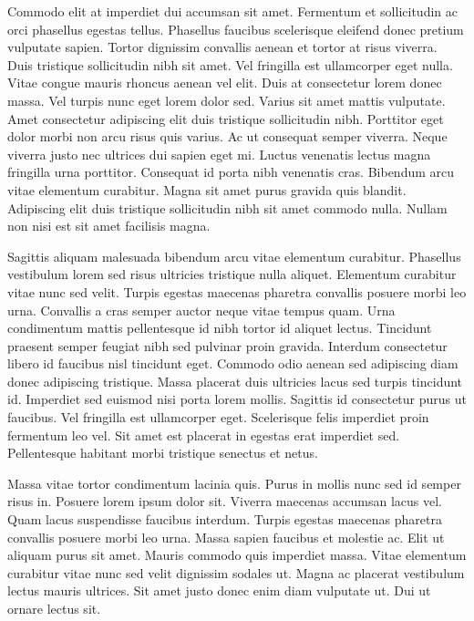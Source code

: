 \documentclass[11pt,a4paper]{article}
\begin{document}
Commodo elit at imperdiet dui accumsan sit amet. Fermentum et sollicitudin ac orci phasellus egestas tellus. Phasellus faucibus scelerisque eleifend donec pretium vulputate sapien. Tortor dignissim convallis aenean et tortor at risus viverra. Duis tristique sollicitudin nibh sit amet. Vel fringilla est ullamcorper eget nulla. Vitae congue mauris rhoncus aenean vel elit. Duis at consectetur lorem donec massa. Vel turpis nunc eget lorem dolor sed. Varius sit amet mattis vulputate. Amet consectetur adipiscing elit duis tristique sollicitudin nibh. Porttitor eget dolor morbi non arcu risus quis varius. Ac ut consequat semper viverra. Neque viverra justo nec ultrices dui sapien eget mi. Luctus venenatis lectus magna fringilla urna porttitor. Consequat id porta nibh venenatis cras. Bibendum arcu vitae elementum curabitur. Magna sit amet purus gravida quis blandit. Adipiscing elit duis tristique sollicitudin nibh sit amet commodo nulla. Nullam non nisi est sit amet facilisis magna.

Sagittis aliquam malesuada bibendum arcu vitae elementum curabitur. Phasellus vestibulum lorem sed risus ultricies tristique nulla aliquet. Elementum curabitur vitae nunc sed velit. Turpis egestas maecenas pharetra convallis posuere morbi leo urna. Convallis a cras semper auctor neque vitae tempus quam. Urna condimentum mattis pellentesque id nibh tortor id aliquet lectus. Tincidunt praesent semper feugiat nibh sed pulvinar proin gravida. Interdum consectetur libero id faucibus nisl tincidunt eget. Commodo odio aenean sed adipiscing diam donec adipiscing tristique. Massa placerat duis ultricies lacus sed turpis tincidunt id. Imperdiet sed euismod nisi porta lorem mollis. Sagittis id consectetur purus ut faucibus. Vel fringilla est ullamcorper eget. Scelerisque felis imperdiet proin fermentum leo vel. Sit amet est placerat in egestas erat imperdiet sed. Pellentesque habitant morbi tristique senectus et netus.

Massa vitae tortor condimentum lacinia quis. Purus in mollis nunc sed id semper risus in. Posuere lorem ipsum dolor sit. Viverra maecenas accumsan lacus vel. Quam lacus suspendisse faucibus interdum. Turpis egestas maecenas pharetra convallis posuere morbi leo urna. Massa sapien faucibus et molestie ac. Elit ut aliquam purus sit amet. Mauris commodo quis imperdiet massa. Vitae elementum curabitur vitae nunc sed velit dignissim sodales ut. Magna ac placerat vestibulum lectus mauris ultrices. Sit amet justo donec enim diam vulputate ut. Dui ut ornare lectus sit.
\end{document}
